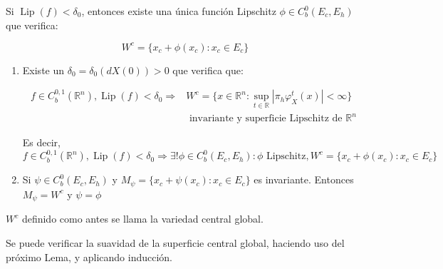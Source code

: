 \begin{lem}
	Si $\operatorname{Lip}(f)< \delta_0$, entonces existe una única función Lipschitz $\phi \in C_b^0(E_c,E_h)$ que verifica: 
	
	\begin{equation*}
		W^c = \{x_c + \phi(x_c): x_c \in E_c\}
	\end{equation*}
\end{lem}


\begin{thm}
	\begin{enumerate}
		\item Existe un $\delta_0 = \delta_0(dX(0))>0$ que verifica que:
		
		\begin{align*}
			f \in C_b^{0,1}(\mathbb{R}^n), \operatorname{Lip}(f)< \delta_0 \Rightarrow &W^c= \{ x \in \mathbb{R}^n: \sup_{t\in \mathbb{R}}|\pi_h \varphi^t_X(x)| < \infty \}\\
			& \text{ invariante y superficie Lipschitz de } \mathbb{R}^n
		\end{align*}
		
		Es decir, \begin{equation*}
			f \in C_b^{0,1}(\mathbb{R}^n), \operatorname{Lip}(f)< \delta_0 \Rightarrow \exists! \phi \in C_b^0(E_c,E_h): \phi \text{ Lipschitz}, W^c = \{x_c + \phi(x_c): x_c \in E_c \}
		\end{equation*}
		
		\item  Si $\psi \in C_b^0(E_c,E_h)$ y  $M_\psi = \{x_c + \psi(x_c): x_c \in E_c \}$ es invariante. Entonces $M_\psi = W^c$ y $\psi = \phi$
	\end{enumerate}
\end{thm}


\begin{defn}
	$W^c$ definido como antes se llama la variedad central global.
\end{defn}

\begin{rmrk}
	Se puede verificar la suavidad de la superficie central global, haciendo uso del próximo Lema, y aplicando inducción.
\end{rmrk}

